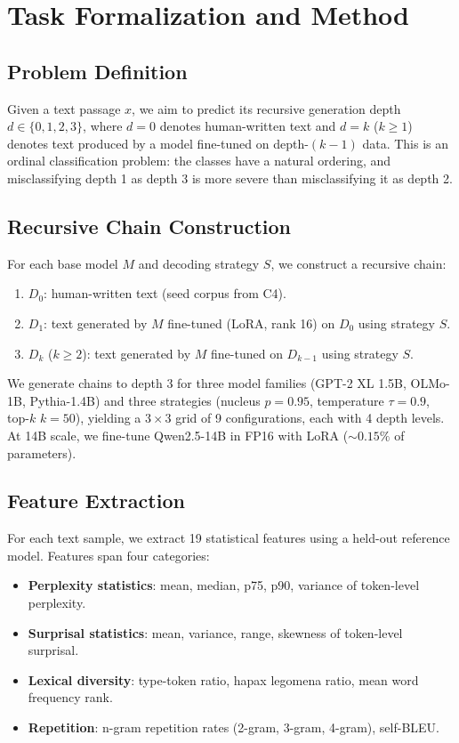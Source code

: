 \documentclass[11pt,a4paper]{article}
\begin{document}
\section{Task Formalization and Method}

\subsection{Problem Definition}

Given a text passage $x$, we aim to predict its recursive generation depth $d \in \{0, 1, 2, 3\}$, where $d{=}0$ denotes human-written text and $d{=}k$ ($k \geq 1$) denotes text produced by a model fine-tuned on depth-$(k{-}1)$ data. This is an ordinal classification problem: the classes have a natural ordering, and misclassifying depth 1 as depth 3 is more severe than misclassifying it as depth 2.

\subsection{Recursive Chain Construction}

For each base model $M$ and decoding strategy $S$, we construct a recursive chain:
\begin{enumerate}[nosep]
    \item $D_0$: human-written text (seed corpus from C4).
    \item $D_1$: text generated by $M$ fine-tuned (LoRA, rank 16) on $D_0$ using strategy $S$.
    \item $D_k$ ($k \geq 2$): text generated by $M$ fine-tuned on $D_{k-1}$ using strategy $S$.
\end{enumerate}
We generate chains to depth 3 for three model families (GPT-2 XL 1.5B, OLMo-1B, Pythia-1.4B) and three strategies (nucleus $p{=}0.95$, temperature $\tau{=}0.9$, top-$k$ $k{=}50$), yielding a $3 \times 3$ grid of 9 configurations, each with 4 depth levels. At 14B scale, we fine-tune Qwen2.5-14B in FP16 with LoRA (${\sim}0.15\%$ of parameters).

\subsection{Feature Extraction}

For each text sample, we extract 19 statistical features using a held-out reference model. Features span four categories:
\begin{itemize}[nosep]
    \item \textbf{Perplexity statistics}: mean, median, p75, p90, variance of token-level perplexity.
    \item \textbf{Surprisal statistics}: mean, variance, range, skewness of token-level surprisal.
    \item \textbf{Lexical diversity}: type-token ratio, hapax legomena ratio, mean word frequency rank.
    \item \textbf{Repetition}: n-gram repetition rates (2-gram, 3-gram, 4-gram), self-BLEU.
\end{itemize}
\end{document}
